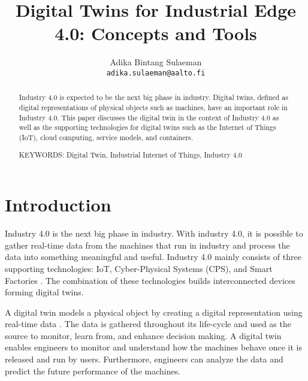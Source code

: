 \documentclass[article]{aaltoseries}
\begin{document}
 

\title{Digital Twins for Industrial Edge 4.0: Concepts and Tools}

\author{Adika Bintang Sulaeman%
\\\textnormal{\texttt{adika.sulaeman@aalto.fi}}} %


\maketitle


\begin{abstract}
  Industry 4.0 is expected to be the next big phase in industry. Digital twins, defined as digital representations of physical objects such as machines, have an important role in Industry 4.0. This paper discusses the digital twin in the context of Industry 4.0 as well as the supporting technologies for digital twins such as the Internet of Things (IoT), cloud computing, service models, and containers.
  
\vspace{3mm}
\noindent KEYWORDS: Digital Twin, Industrial Internet of Things, Industry 4.0

\end{abstract}




\section{Introduction}

Industry 4.0 is the next big phase in industry. With industry 4.0, it is possible to gather real-time data from the machines that run in industry and process the data into something meaningful and useful. Industry 4.0 mainly consists of three supporting technologies: IoT, Cyber-Physical Systems (CPS), and Smart Factories \cite{hermann2016design}. The combination of these technologies builds interconnected devices forming digital twins.

A digital twin models a physical object by creating a digital representation using real-time data \cite{Cheatshe3:online}. The data is gathered throughout its life-cycle and used as the source to monitor, learn from, and enhance decision making. A digital twin enables engineers to monitor and understand how the machines behave once it is released and run by users. Furthermore, engineers can analyze the data and predict the future performance of the machines.
\end{document}
